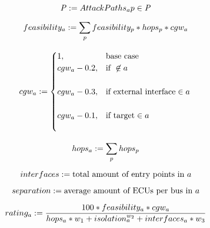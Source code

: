 \begin{equation}
    \mathit{P} := {Attack Paths_{a}} p \in \mathit{P} \label{eq:attack_paths}\\\\
\end{equation}

\begin{equation}
    feasibility_{a} := \sum_{p} feasibility_{p} * hops_{p} * cgw_{a} \label{eq:feasibility}\\\\
\end{equation}

\begin{equation}
    cgw_{a} := 
    \begin{cases}
    1,&\text{base case}\\
    cgw_{a} - 0.2,&\text{if } \not\in a\\\\
    cgw_{a} - 0.3,&\text{if external interface} \in a\\\\
    cgw_{a} - 0.1,&\text{if target} \in a\\\\
    \end{cases} \label{eq:cgw}\\\\
\end{equation}

\begin{equation}
    hops_{a} := \sum_{p} hops_{p} \label{eq:hops}\\\\
\end{equation}

\begin{equation}
    interfaces := \text{total amount of entry points in } a \label{eq:interfaces}\\\\
\end{equation}

\begin{equation}
    separation := \text{average amount of ECUs per bus in } a \label{eq:separation}\\\\
\end{equation}

\begin{equation}
    rating_{a} := \frac{100 * feasibility_{a} * cgw_{a}}{hops_{a}*w_{1} + isolation_{a}^{w_{2}} + interfaces_{a}*w_{3}} \label{eq:rating}\\\\
\end{equation}


